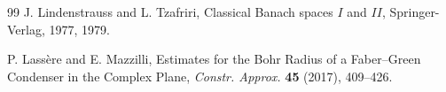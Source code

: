 \documentclass[a4paper,11pt, reqno]{amsart}
\theoremstyle{definition}
\begin{document}
\begin{thebibliography}{99}
	 {\sc J. Lindenstrauss} and {\sc L. Tzafriri}, Classical Banach spaces $I$ and $II$, Springer-Verlag, 1977, 1979.
	
			 {\sc P. Lassère} and {E. Mazzilli}, Estimates for the Bohr Radius of a Faber–Green Condenser in the Complex Plane, {\it Constr. Approx.} {\bf 45} (2017), 409--426.
	
	
	
	
	
	
	
	
	
	
	

\end{thebibliography}
\end{document}
